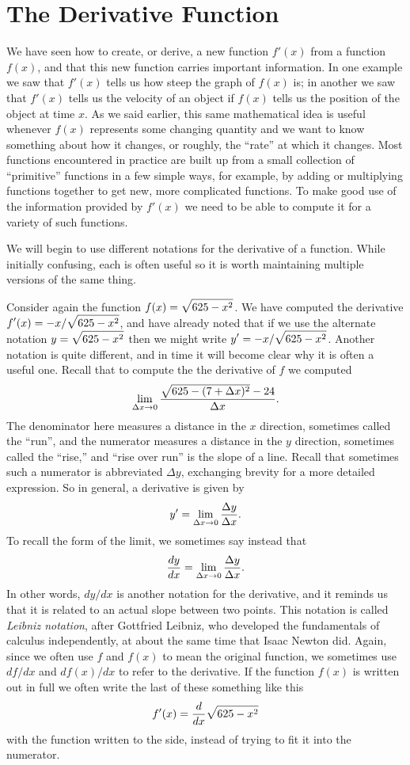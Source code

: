\section{The Derivative Function}{}{}

We have seen how to create, or derive, a new function $f'(x)$ from a
function $f(x)$, and that this new function carries important
information. In one example we saw that $f'(x)$ tells us how steep the
graph of $f(x)$ is; in another we saw that $f'(x)$ tells us the velocity
of an object if $f(x)$ tells us the  position of the object at time
$x$. As we said earlier, this same mathematical idea is useful
whenever $f(x)$ represents some changing quantity and we want to know
something about how it changes, or roughly, the ``rate'' at which it
changes. Most functions encountered in practice are built up from a
small collection of ``primitive'' functions in a few simple ways, for
example, by adding or multiplying functions together to get new, more
complicated functions. To make good use of the information provided by
$f'(x)$ we need to be able to compute it for a variety of such functions.

We will begin to use different notations for the derivative of a
function. While initially confusing, each is often useful so it is
worth maintaining multiple versions of the same thing.

Consider again the function $\displaystyle f(x)=\sqrt{625-x^2}$.
We have computed the derivative $\displaystyle f'(x)=-x/\sqrt{625-x^2}$, and have
already noted that if we use the alternate notation
$\displaystyle y=\sqrt{625-x^2}$ then we might write $\displaystyle y'=-x/\sqrt{625-x^2}$.
Another notation is quite different, and in time it will become clear
why it is often a useful one. Recall that to compute the the
derivative of $f$ we computed 
$$
\lim_{\Delta x\to0} {\sqrt{625-(7+\Delta x)^2} - 24\over \Delta x}.
$$
The denominator here measures a distance in the $x$ direction,
sometimes called the ``run'', and the numerator measures a distance in
the $y$ direction, sometimes called the ``rise,'' and ``rise over
run'' is the slope of a line. Recall that sometimes such a numerator is
abbreviated $\Delta y$, exchanging brevity for a more detailed
expression. So in general, a derivative is given by
$$
y'=\lim_{\Delta x\to0} {\Delta y\over \Delta x}.
$$
To recall the form of the limit, we sometimes say instead that
$$
{dy\over dx}=\lim_{\Delta x\to0} {\Delta y\over \Delta x}.
$$ In other words, $dy/dx$ is another notation for the derivative, and
it reminds us that it is related to an actual slope between two
points. This notation is called {\it Leibniz
notation\/}, 
after Gottfried Leibniz, who developed the fundamentals
of calculus independently, at about the same time that Isaac Newton
did.  Again, since we often use $f$ and $f(x)$ to mean the original
function, we sometimes use $df/dx$ and $df(x)/dx$ to refer to the
derivative. If the function $f(x)$ is written out in full we often
write the last of these something like this
$$f'(x)={d\over dx}\sqrt{625-x^2}
$$
with the function written to the side, instead of trying to fit it into
the numerator.

